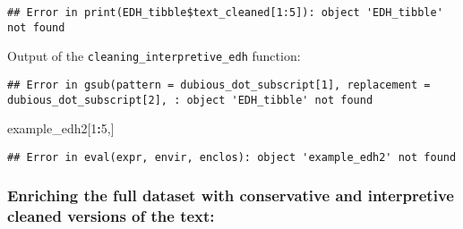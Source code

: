 \documentclass[]{article}
\newenvironment{Shaded}{\begin{snugshade}}{\end{snugshade}}
\newcommand{\DataTypeTok}[1]{\textcolor[rgb]{0.13,0.29,0.53}{#1}}
\newcommand{\DecValTok}[1]{\textcolor[rgb]{0.00,0.00,0.81}{#1}}
\newcommand{\KeywordTok}[1]{\textcolor[rgb]{0.13,0.29,0.53}{\textbf{#1}}}
\newcommand{\NormalTok}[1]{#1}
\newcommand{\OperatorTok}[1]{\textcolor[rgb]{0.81,0.36,0.00}{\textbf{#1}}}
\newcommand{\StringTok}[1]{\textcolor[rgb]{0.31,0.60,0.02}{#1}}
\begin{document}
\begin{verbatim}
## Error in print(EDH_tibble$text_cleaned[1:5]): object 'EDH_tibble' not found
\end{verbatim}

Output of the \texttt{cleaning\_interpretive\_edh} function:

\begin{Shaded}
\end{Shaded}

\begin{verbatim}
## Error in gsub(pattern = dubious_dot_subscript[1], replacement = dubious_dot_subscript[2], : object 'EDH_tibble' not found
\end{verbatim}

\begin{Shaded}
\begin{Highlighting}[]
\NormalTok{example_edh2[}\DecValTok{1}\OperatorTok{:}\DecValTok{5}\NormalTok{,]}
\end{Highlighting}
\end{Shaded}

\begin{verbatim}
## Error in eval(expr, envir, enclos): object 'example_edh2' not found
\end{verbatim}

\hypertarget{enriching-the-full-dataset-with-conservative-and-interpretive-cleaned-versions-of-the-text}{%
\subsubsection{Enriching the full dataset with conservative and
interpretive cleaned versions of the
text:}\label{enriching-the-full-dataset-with-conservative-and-interpretive-cleaned-versions-of-the-text}}

\begin{Shaded}
\end{Shaded}
\end{document}
